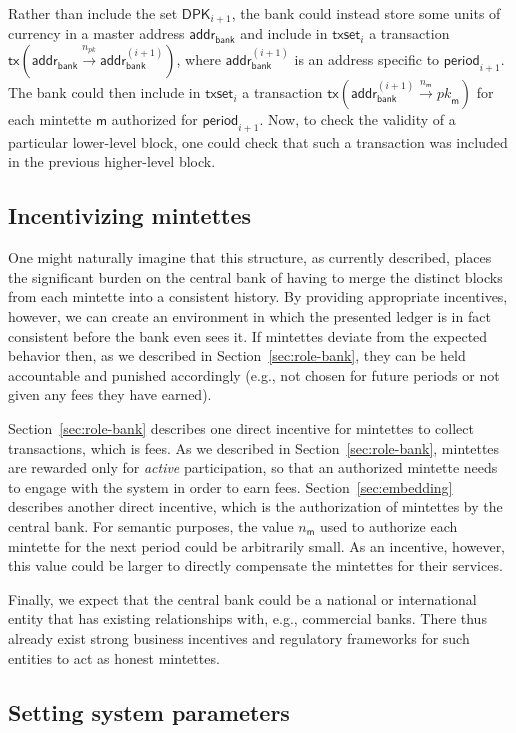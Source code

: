 \documentclass[conference]{IEEEtran}
\newcommand{\pk}{{\ensuremath{pk}}}
\newcommand{\addr}{\mathsf{addr}}
\newcommand{\period}{\mathsf{period}}
\newcommand{\txspec}[3]{\mathsf{tx}({#1}\xrightarrow{{#2}}{#3})}
\newcommand{\bank}{\mathsf{bank}}
\newcommand{\mintette}{\mathsf{m}}
\newcommand{\txset}{\mathsf{txset}}
\newcommand{\periodpk}[1]{\addr_\bank^{({#1})}}
\newcommand{\periodmintette}[1]{\mathsf{DPK}_{{#1}}}
\begin{document}
Rather than include the set $\periodmintette{i+1}$, the bank could instead
store some units of currency in a master address $\addr_\bank$ and include in
$\txset_i$ a transaction $\txspec{\addr_\bank}{n_{\pk}}{\periodpk{i+1}}$,
where $\periodpk{i+1}$ is an address specific to $\period_{i+1}$.
The bank could then include in $\txset_i$ a transaction
$\txspec{\periodpk{i+1}}{n_\mintette}{\pk_\mintette}$
for each mintette $\mintette$ authorized for $\period_{i+1}$.
Now, to check the validity of a particular lower-level block, one could check
that such a transaction was included in the previous higher-level block.

\subsection{Incentivizing mintettes}\label{sec:incentives}

One might naturally imagine that this structure, as currently described,
places the significant burden on the central bank of having to merge the
distinct blocks from each mintette into a consistent history.  By providing
appropriate incentives, however, we can create an environment in which
the presented ledger is in fact consistent before the bank
even sees it.  If mintettes deviate from the expected behavior then, as we
described in Section~\ref{sec:role-bank}, they can be held accountable and
punished accordingly (e.g., not chosen for future periods or not given any
fees they have earned).

Section~\ref{sec:role-bank} describes one direct incentive for mintettes to
collect transactions, which is fees.  As we described in Section~\ref{sec:role-bank},
mintettes are rewarded only for \emph{active} participation, so that an
authorized mintette needs to engage with the system in order to earn
fees.
Section~\ref{sec:embedding} describes another direct incentive, which is the
authorization of mintettes by the central bank.  For semantic purposes, the
value $n_\mintette$ used to authorize each mintette for the next period
could be arbitrarily small.  As an incentive, however, this value
could be larger to directly compensate the mintettes for their services.


Finally, we expect that the central bank could be a national or international
entity that has existing relationships with, e.g., commercial banks.  There
thus
already exist strong business incentives and regulatory frameworks for such
entities to act as honest mintettes.

\subsection{Setting system parameters}\label{sec:parameters}
\end{document}
